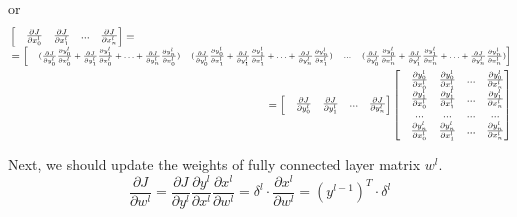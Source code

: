or 
\begin{equation}
\label{eq:CNN_softmax_grad_long}
	\begin{multlined}
	\begin{bmatrix} 
	&\frac{\partial J}{\partial x^{l}_{0}} &\frac{\partial J}{\partial x^{l}_{1}} & ... &\frac{\partial J}{\partial x^{l}_{n}} 
	\end{bmatrix} 
	= \\= \scriptsize 
	\begin{bmatrix} & (\frac{\partial J}{\partial y^{l}_{0}}\frac{\partial y^{l}_{0}}{\partial x^{l}_{0}}+\frac{\partial J}{\partial y^{l}_{1}}\frac{\partial y^{l}_{1}}{\partial x^{l}_{0}}+\ldots+\frac{\partial J}{\partial y^{l}_{n}}\frac{\partial y^{l}_{n}}{\partial x^{l}_{0}}) & (\frac{\partial J}{\partial y^{l}_{0}}\frac{\partial y^{l}_{0}}{\partial x^{l}_{1}}+\frac{\partial J}{\partial y^{l}_{1}}\frac{\partial y^{l}_{1}}{\partial x^{l}_{1}}+\ldots+\frac{\partial J}{\partial y^{l}_{n}}\frac{\partial y^{l}_{n}}{\partial x^{l}_{1}}) & ... & (\frac{\partial J}{\partial y^{l}_{0}}\frac{\partial y^{l}_{0}}{\partial x^{l}_{n}}+\frac{\partial J}{\partial y^{l}_{1}}\frac{\partial y^{l}_{1}}{\partial x^{l}_{n}}+\ldots+\frac{\partial J}{\partial y^{l}_{n}}\frac{\partial y^{l}_{n}}{\partial x^{l}_{n}}) 
	\end{bmatrix} \\= 
	\begin{bmatrix} &\frac{\partial J}{\partial y^{l}_{0}} &\frac{\partial J}{\partial y^{l}_{1}} & ... &\frac{\partial J}{\partial y^{l}_{n}} 
	\end{bmatrix} 
	\begin{bmatrix} &\frac{\partial y^{l}_{0}}{\partial x^{l}_{0}} &\frac{\partial y^{l}_{0}}{\partial x^{l}_{1}}&...&\frac{\partial y^{l}_{0}}{\partial x^{l}_{n}}\\ &\frac{\partial y^{l}_{1}}{\partial x^{l}_{0}} &\frac{\partial y^{l}_{1}}{\partial x^{l}_{1}}&...&\frac{\partial y^{l}_{1}}{\partial x^{l}_{n}}\\ &...&...&...&...\\ &\frac{\partial y^{l}_{n}}{\partial x^{l}_{0}} &\frac{\partial y^{l}_{n}}{\partial x^{l}_{1}}&...&\frac{\partial y^{l}_{n}}{\partial x^{l}_{n}}\\ 
	\end{bmatrix}
	\end{multlined}
\end{equation}

Next, we should update the weights of fully connected layer matrix $w^l$. 
\begin{equation}
\frac{\partial J}{\partial w^l} = \dfrac{\partial J}{\partial y^l}\dfrac{\partial y^l}{\partial x^l}\dfrac{\partial x^l}{\partial w^l} = \delta^l \cdot \dfrac{\partial x^l}{\partial w^l} = \left(y^{l-1} \right)^T \cdot \delta^l    
\end{equation}

